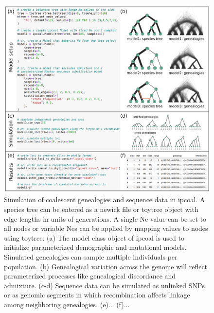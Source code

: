 \documentclass[11pt]{article}
\begin{document}
\begin{figure}
  \centering
  \includegraphics[width=15cm]{figures/composite.pdf}
  \caption{Simulation of coalescent genealogies and sequence data in ipcoal. A species tree can be entered as a newick file or toytree object with edge lengths in units of generations. A single Ne value can be set to all nodes or variable Nes can be applied by mapping values to nodes using toytree. (a) The model class object of ipcoal is used to initialize parameterized demographic and mutational models. Simulated genealogies can sample multiple individuals per population. (b) Genealogical variation across the genome will reflect parameterized processes like genealogical discordance and admixture. (c-d) Sequence data can be simulated as unlinked SNPs or as genomic segments in which recombination affects linkage among neighboring genealogies. (e)... (f)... }
  \label{fig:fig1}
\end{figure}



  




\end{document}
